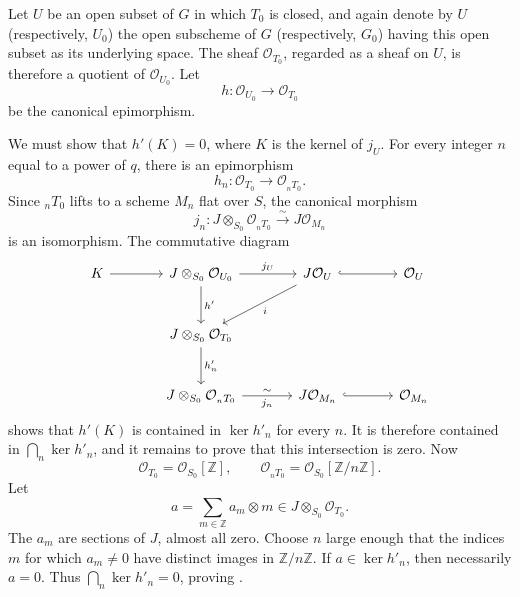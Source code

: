 Let \(U\) be an open subset of \(G\) in which \(T_0\) is closed, and
again denote by \(U\) (respectively, \(U_0\)) the open subscheme of
\(G\) (respectively, \(G_0\)) having this open subset as its underlying
space. The sheaf \(\mathcal O_{T_0}\), regarded as a sheaf on \(U\), is
therefore a quotient of \(\mathcal O_{U_0}\). Let
\[
  h:\mathcal O_{U_0}\longrightarrow\mathcal O_{T_0}
\]
be the canonical epimorphism.


We must show that \(h'(K)=0\), where \(K\) is the kernel of \(j_U\).
For every integer \(n\) equal to a power of \(q\), there is an
epimorphism
\[
  h_n:\mathcal O_{T_0}\longrightarrow\mathcal O_{{}_nT_0}.
\]
Since \({}_nT_0\) lifts to a scheme \(M_n\) flat over \(S\), the
canonical morphism
\[
  j_n:J\otimes_{S_0}\mathcal O_{{}_nT_0}
  \xrightarrow{\sim}J\mathcal O_{M_n}
\]
is an isomorphism. The commutative diagram
\[
\begin{tikzcd}[column sep=large,row sep=large]
K \arrow[r]
  & J\otimes_{S_0}\mathcal O_{U_0}
      \arrow[r,"j_U"] \arrow[d,"h'"]
  & J\mathcal O_U \arrow[r,hook] \arrow[dl,"i"]
  & \mathcal O_U \\
  & J\otimes_{S_0}\mathcal O_{T_0}
      \arrow[d,"h'_n"] & & \\
  & J\otimes_{S_0}\mathcal O_{{}_nT_0}
      \arrow[r,"j_n"',"\sim"] & J\mathcal O_{M_n}
      \arrow[r,hook] & \mathcal O_{M_n}
\end{tikzcd}
\]
shows that \(h'(K)\) is contained in \(\ker h'_n\) for every \(n\).
It is therefore contained in \(\bigcap_n\ker h'_n\), and it remains
to prove that this intersection is zero. Now
\[
  \mathcal O_{T_0}=\mathcal O_{S_0}[\mathbb Z],
  \qquad
  \mathcal O_{{}_nT_0}
     =\mathcal O_{S_0}[\mathbb Z/n\mathbb Z].
\]
Let
\[
  a=\sum_{m\in\mathbb Z}a_m\otimes m
  \in J\otimes_{S_0}\mathcal O_{T_0}.
\]
The \(a_m\) are sections of \(J\), almost all zero. Choose \(n\) large
enough that the indices \(m\) for which \(a_m\ne0\) have distinct
images in \(\mathbb Z/n\mathbb Z\). If \(a\in\ker h'_n\), then
necessarily \(a=0\). Thus \(\bigcap_n\ker h'_n=0\), proving .

